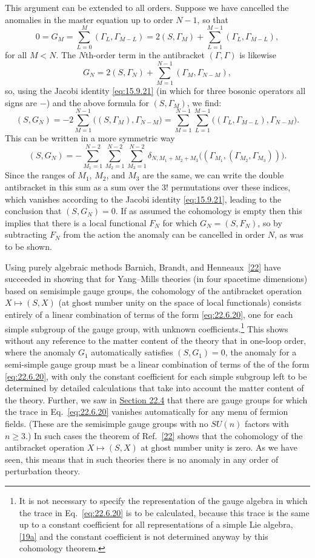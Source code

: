 This argument can be extended to all orders. Suppose we have cancelled
the anomalies in the master equation up to order $N-1$, so that
\[
 0=G_M
 =\sum_{L=0}^{M}(\Gamma_L,\Gamma_{M-L})
 =2(S,\Gamma_M)
 +\sum_{L=1}^{M-1}(\Gamma_L,\Gamma_{M-L}),
\]
for all $M<N$. The $N$th-order term in the antibracket
$(\Gamma,\Gamma)$ is likewise
\[
 G_N=2(S,\Gamma_N)
 +\sum_{M=1}^{N-1}(\Gamma_M,\Gamma_{N-M}),
\]
so, using the Jacobi identity \eqref{eq:15.9.21} (in which for three
bosonic operators all signs are $-$) and the above formula for
$(S,\Gamma_M)$, we find:
\[
 (S,G_N)
 =-2\sum_{M=1}^{N-1}\bigl((S,\Gamma_M),\Gamma_{N-M}\bigr)
 =\sum_{M=1}^{N-1}\sum_{L=1}^{M-1}
 \bigl((\Gamma_L,\Gamma_{M-L}),\Gamma_{N-M}\bigr).
\]
This can be written in a more symmetric way
\[
 (S,G_N)
 =-\sum_{M_1=1}^{N-2}\sum_{M_2=1}^{N-2}\sum_{M_3=1}^{N-2}
 \delta_{N,M_1+M_2+M_3}
 \bigl((\Gamma_{M_1},(\Gamma_{M_2},\Gamma_{M_3}))\bigr).
\]
Since the ranges of $M_1$, $M_2$, and $M_3$ are the same, we can write
the double antibracket in this sum as a sum over the $3!$ permutations
over these indices, which vanishes according to the Jacobi identity
\eqref{eq:15.9.21}, leading to the conclusion that $(S,G_N)=0$. If as
assumed the cohomology is empty then this implies that there is a local
functional $F_N$ for which $G_N=(S,F_N)$, so by subtracting $F_N$ from
the action the anomaly can be cancelled in order $N$, as was to be shown.

Using purely algebraic methods Barnich, Brandt, and
Henneaux~\hyperref[ch22-ref-22]{[22]} have succeeded in showing that for
Yang--Mills theories (in four spacetime dimensions) based on semisimple
gauge groups, the cohomology of the antibracket operation
$X\mapsto(S,X)$ (at ghost number unity on the space of local functionals)
consists entirely of a linear combination of terms of the form
\eqref{eq:22.6.20}, one for each simple subgroup of the gauge group, with
unknown coefficients.\footnote{It is not necessary to specify the
representation of the gauge algebra in which the trace in
Eq.~\eqref{eq:22.6.20} is to be calculated, because this trace is the same
up to a constant coefficient for all representations of a simple Lie
algebra,\hyperref[ch22-ref-19a]{[19a]} and the constant coefficient is not
determined anyway by this cohomology theorem.} This shows without any
reference to the matter content of the theory that in one-loop order,
where the anomaly $G_1$ automatically satisfies $(S,G_1)=0$, the anomaly
for a semi-simple gauge group must be a linear combination of terms of the
of the form \eqref{eq:22.6.20}, with only the constant coefficient for each
simple subgroup left to be determined by detailed calculations that take
into account the matter content of the theory. Further, we saw in
\hyperref[sec:22.4]{Section 22.4} that there are gauge groups for which the
trace in Eq.~\eqref{eq:22.6.20} vanishes automatically for any menu of
fermion fields. (These are the semisimple gauge groups with no $SU(n)$
factors with $n\geq3$.) In such cases the theorem of
Ref.~\hyperref[ch22-ref-22]{[22]} shows that the cohomology of the
antibracket operation $X\mapsto(S,X)$ at ghost number unity is zero. As we
have seen, this means that in such theories there is no anomaly in any
order of perturbation theory.

